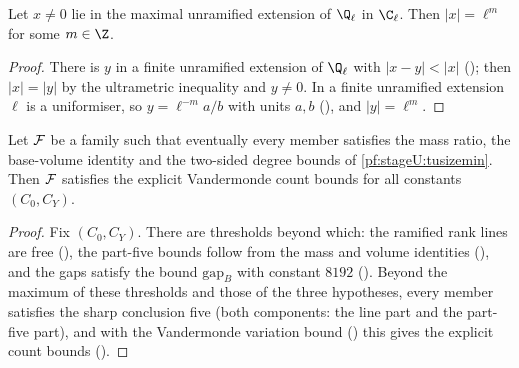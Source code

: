 \begin{lemma}\label{pf:stageU:kurval}
Let $x\ne0$ lie in the maximal unramified extension of $\Q_\ell$ in $\C_\ell$. Then $|x|=\ell^m$ for some $m\in\Z$.
\end{lemma}

\begin{proof}
There is $y$ in a finite unramified extension of $\Q_\ell$ with $|x-y|<|x|$ (); then
$|x|=|y|$ by the ultrametric inequality and $y\ne0$. In a finite unramified extension $\ell$ is a uniformiser, so $y=\ell^{-m}a/b$ with
units $a,b$ (), and $|y|=\ell^m$.
\end{proof}

\begin{lemma}\label{pf:stageU:divlevel}
Let $\mathcal{F}$ be a family such that eventually every member satisfies the mass ratio, the base-volume identity and the two-sided
degree bounds of \cref{pf:stageU:tusizemin}. Then $\mathcal{F}$ satisfies the explicit Vandermonde count bounds for all constants
$(C_0,C_Y)$.
\end{lemma}

\begin{proof}
Fix $(C_0,C_Y)$. There are thresholds beyond which: the ramified rank lines are free (),
the part-five bounds follow from the mass and volume identities (),
and the gaps satisfy the bound $\mathrm{gap}_B$ with constant $8192$ (). Beyond the
maximum of these thresholds and those of the three hypotheses, every member satisfies the sharp conclusion five (both components:
the line part and the part-five part), and with the Vandermonde variation bound
() this gives the explicit count bounds
().
\end{proof}


